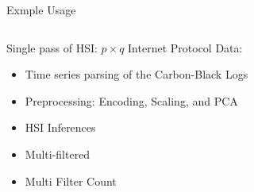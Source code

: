 \begin{frame}{Exmple Usage}
    \begin{columns}
        \begin{column}{.66\textwidth}
            Single pass of HSI:       
            $p\times q$ Internet Protocol Data:
            \begin{itemize}
                \item Time series parsing of the Carbon-Black Logs
                \item Preprocessing: Encoding, Scaling, and PCA
                \item HSI Inferences
                \item Multi-filtered
                \item Multi Filter Count
            \end{itemize}
        \end{column}
        \begin{column}{.33\textwidth}
            \bc
            \vspace{-.5in}
            \begin{figure}               

\end{figure}
\end{column}
\end{columns}
\end{frame}
